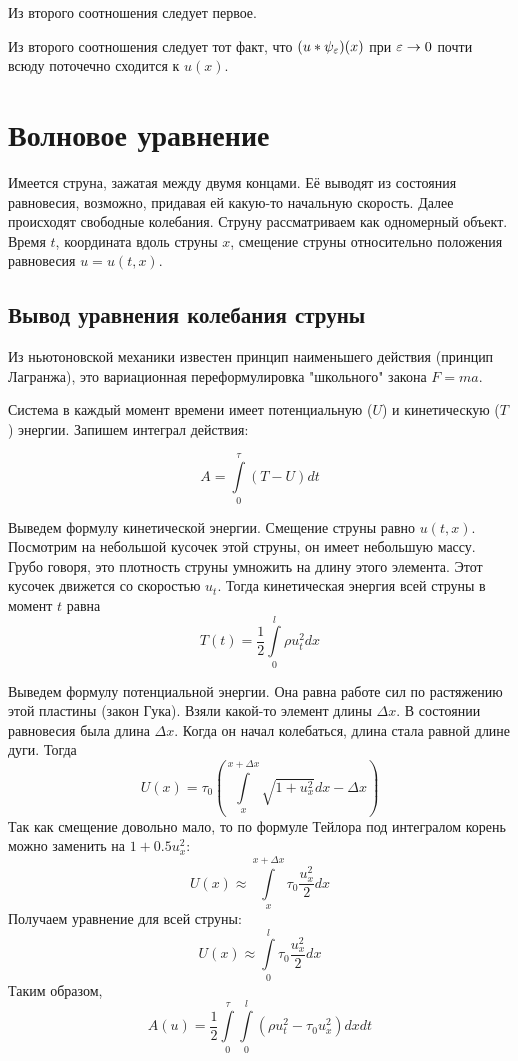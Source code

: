 \begin{exercise}
Из второго соотношения следует первое.
\end{exercise}

\begin{exercise}
Из второго соотношения следует тот факт, что $(u * \psi_{\varepsilon})(x)$ при $\varepsilon \rightarrow 0$ почти всюду поточечно сходится к $u(x)$.
\end{exercise}

\section{Волновое уравнение}

Имеется струна, зажатая между двумя концами. Её выводят из состояния равновесия, возможно, придавая ей какую-то начальную скорость. Далее происходят свободные колебания. Струну рассматриваем как одномерный объект. Время $t$, координата вдоль струны $x$, смещение струны относительно положения равновесия $u = u(t, x)$.

\subsection{Вывод уравнения колебания струны}

Из ньютоновской механики известен принцип наименьшего действия (принцип Лагранжа), это вариационная переформулировка "школьного" закона $F = ma$.

Система в каждый момент времени имеет потенциальную ($U$) и кинетическую ($T$) энергии. Запишем интеграл действия:

$$ A = \int \limits_{0}^{\tau} (T- U) dt $$

Выведем формулу кинетической энергии. Смещение струны равно $u(t,x)$. Посмотрим на небольшой кусочек этой струны, он имеет  небольшую массу. Грубо говоря, это плотность струны умножить на длину этого элемента. Этот кусочек движется со скоростью $u_t$. Тогда кинетическая энергия всей струны в момент $t$ равна
$$ T(t) = \frac {1} {2} \int \limits_0^l \rho u_t^2 dx$$

Выведем формулу потенциальной энергии. Она равна работе сил по растяжению этой пластины (закон Гука). Взяли какой-то элемент длины $\Delta x$. В состоянии равновесия была длина $\Delta x$. Когда он начал колебаться, длина стала равной длине дуги.
Тогда
$$ U(x) = \tau_0 ( \int \limits_x^{x+\Delta x} \sqrt{1 + u_x^2} dx - \Delta x ) $$
Так как смещение довольно мало, то по формуле Тейлора под интегралом корень можно заменить на $ 1 + 0.5 u_x^2 $:
$$ U(x) \approx \int \limits_x^{x+\Delta x} \tau_0  \frac {u_x^2} {2} dx  $$
Получаем уравнение для всей струны:
$$ U(x) \approx \int \limits_0^l \tau_0 \frac {u_x^2} {2} dx $$
Таким образом,
$$ A(u) = \frac {1} {2} \int \limits_0^{\tau}  \int \limits_0^l (\rho u_t^2 - \tau_0 u_x^2) dx dt$$


